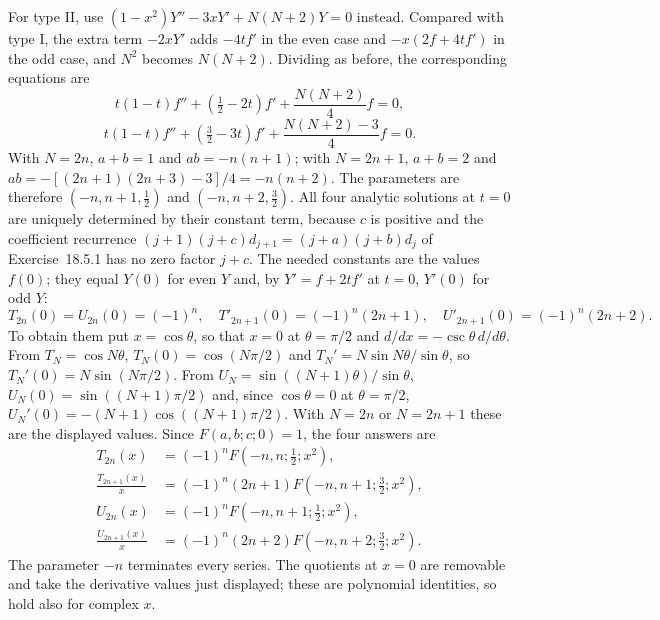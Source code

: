 For type II, use $(1-x^2)Y''-3xY'+N(N+2)Y=0$ instead.
Compared with type I, the extra term $-2xY'$ adds $-4tf'$ in the
even case and $-x(2f+4tf')$ in the odd case, and $N^2$ becomes
$N(N+2)$.  Dividing as before, the corresponding equations are
\[
t(1-t)f''+(\tfrac12-2t)f'+\frac{N(N+2)}4f=0,
\]
\[
t(1-t)f''+(\tfrac32-3t)f'
 +\frac{N(N+2)-3}{4}f=0.
\]
With $N=2n$, $a+b=1$ and $ab=-n(n+1)$; with $N=2n+1$, $a+b=2$ and
$ab=-[(2n+1)(2n+3)-3]/4=-n(n+2)$.  The parameters are therefore
$(-n,n+1,\tfrac12)$ and $(-n,n+2,\tfrac32)$.
All four analytic solutions at $t=0$ are uniquely determined by
their constant term, because $c$ is positive and the coefficient
recurrence $(j+1)(j+c)d_{j+1}=(j+a)(j+b)d_j$ of Exercise~18.5.1
has no zero factor $j+c$.
The needed constants are the values $f(0)$; they equal $Y(0)$ for
even $Y$ and, by $Y'=f+2tf'$ at $t=0$, $Y'(0)$ for odd $Y$:
\[
T_{2n}(0)=U_{2n}(0)=(-1)^n,
\quad T'_{2n+1}(0)=(-1)^n(2n+1),
\quad U'_{2n+1}(0)=(-1)^n(2n+2).
\]
To obtain them put $x=\cos\theta$, so that $x=0$ at
$\theta=\pi/2$ and $d/dx=-\csc\theta\,d/d\theta$.  From
$T_N=\cos N\theta$, $T_N(0)=\cos(N\pi/2)$ and
$T_N'=N\sin N\theta/\sin\theta$, so $T_N'(0)=N\sin(N\pi/2)$.  From
$U_N=\sin((N+1)\theta)/\sin\theta$, $U_N(0)=\sin((N+1)\pi/2)$ and,
since $\cos\theta=0$ at $\theta=\pi/2$,
$U_N'(0)=-(N+1)\cos((N+1)\pi/2)$.  With $N=2n$ or $N=2n+1$ these
are the displayed values.
Since $F(a,b;c;0)=1$, the four answers are
\begin{align*}
T_{2n}(x)&=\boxed{(-1)^nF(-n,n;\tfrac12;x^2)},\\
\frac{T_{2n+1}(x)}x&=\boxed{(-1)^n(2n+1)F(-n,n+1;\tfrac32;x^2)},\\
U_{2n}(x)&=\boxed{(-1)^nF(-n,n+1;\tfrac12;x^2)},\\
\frac{U_{2n+1}(x)}x&=\boxed{(-1)^n(2n+2)F(-n,n+2;\tfrac32;x^2)}.
\end{align*}
The parameter $-n$ terminates every series.  The quotients at $x=0$
are removable and take the derivative values just displayed;
these are polynomial identities, so hold also for complex $x$.

